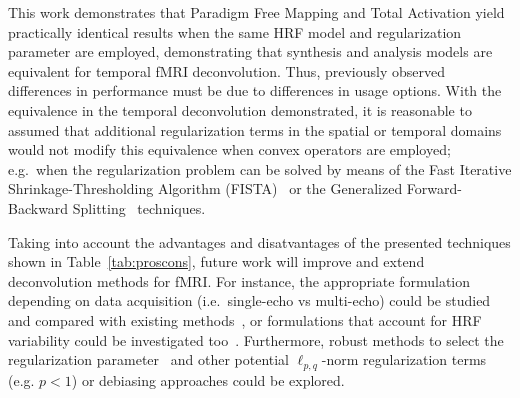 This work demonstrates that Paradigm Free Mapping and Total Activation yield practically identical results when the same HRF model and regularization parameter are employed, demonstrating that synthesis and analysis models are equivalent for temporal fMRI deconvolution. Thus, previously observed differences in performance must be due to differences in usage options. With the equivalence in the temporal deconvolution demonstrated, it is reasonable to assumed that additional regularization terms in the spatial or temporal domains would not modify this equivalence when convex operators are employed; e.g.\ when the regularization problem can be solved by means of the Fast Iterative Shrinkage-Thresholding Algorithm (FISTA)~\cite{beck2009FastIterativeShrinkagethresholding} or the Generalized Forward-Backward Splitting~\cite{raguet2013GeneralizedForwardBackwardSplittinga} techniques.

Taking into account the advantages and disatvantages of the presented techniques shown in Table~\ref{tab:proscons}, future work will improve and extend deconvolution methods for fMRI. For instance, the appropriate formulation depending on data acquisition (i.e.\ single-echo vs multi-echo) could be studied and compared with existing methods~\cite{caballero-gaudes2019DeconvolutionAlgorithmMultiecho}, or formulations that account for HRF variability could be investigated too~\cite{badillo2013GrouplevelImpactsBetweensubject,gaudes2012StructuredSparseDeconvolution,farouj2019BoldSignalDeconvolution}. Furthermore, robust methods to select the regularization parameter~\cite{meinshausen2009StabilitySelection,urunuela2020StabilityBasedSparseParadigm} and other potential \(\ell_{p,q}\)-norm regularization terms (e.g. \(p < 1\)) or debiasing approaches could be explored.